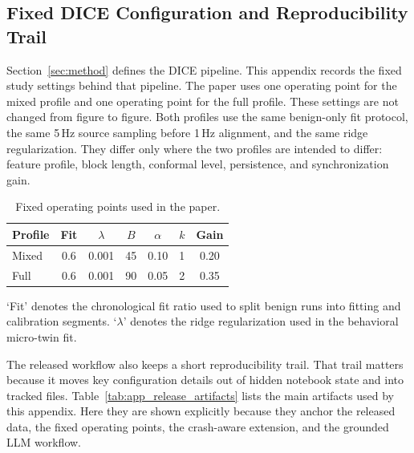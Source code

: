 \FloatBarrier

\subsection{Fixed \textsc{DICE} Configuration and Reproducibility Trail}\label{app:config_release}

Section~\ref{sec:method} defines the \textsc{DICE} pipeline. This appendix records the fixed study settings behind that pipeline. The paper uses one operating point for the mixed profile and one operating point for the full profile. These settings are not changed from figure to figure. Both profiles use the same benign-only fit protocol, the same 5\,Hz source sampling before 1\,Hz alignment, and the same ridge regularization. They differ only where the two profiles are intended to differ: feature profile, block length, conformal level, persistence, and synchronization gain.

\begin{table}[!t]
\centering
\caption{Fixed operating points used in the paper.}
\label{tab:app_operating_points}
{\scriptsize
\setlength{\tabcolsep}{2.8pt}
\renewcommand{\arraystretch}{1.02}
\begin{tabular*}{\columnwidth}{@{\extracolsep{\fill}}lcccccc@{}}
\toprule
Profile & Fit & $\lambda$ & $B$ & $\alpha$ & $k$ & Gain \\
\midrule
Mixed & 0.6 & 0.001 & 45 & 0.10 & 1 & 0.20 \\
Full  & 0.6 & 0.001 & 90 & 0.05 & 2 & 0.35 \\
\bottomrule
\end{tabular*}

\vspace{2pt}
{\scriptsize\raggedright
`Fit' denotes the chronological fit ratio used to split benign runs into fitting and calibration segments. `$\lambda$' denotes the ridge regularization used in the behavioral micro-twin fit.\par
}
}
\end{table}

The released workflow also keeps a short reproducibility trail. That trail matters because it moves key configuration details out of hidden notebook state and into tracked files. Table~\ref{tab:app_release_artifacts} lists the main artifacts used by this appendix. Here they are shown explicitly because they anchor the released data, the fixed operating points, the crash-aware extension, and the grounded LLM workflow.

